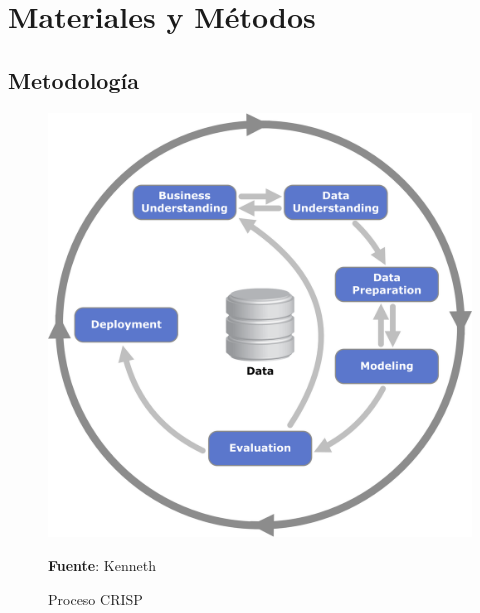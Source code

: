 \section{Materiales y Métodos}

\subsection{Metodología}
 

 



\begin{figure}[H]
\centering
\includegraphics[scale=0.8]{img/crisp}
\caption{Proceso CRISP}
\textbf{Fuente}: Kenneth \cite{KennethJensen2012}
\end{figure}	


